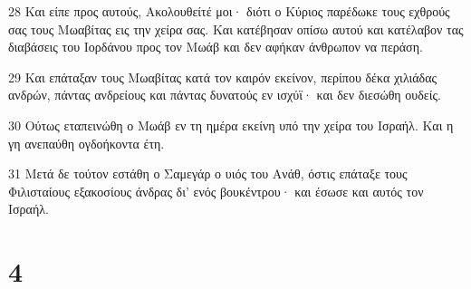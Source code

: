 \par 28 Και είπε προς αυτούς, Ακολουθείτέ μοι· διότι ο Κύριος παρέδωκε τους εχθρούς σας τους Μωαβίτας εις την χείρα σας. Και κατέβησαν οπίσω αυτού και κατέλαβον τας διαβάσεις του Ιορδάνου προς τον Μωάβ και δεν αφήκαν άνθρωπον να περάση.
\par 29 Και επάταξαν τους Μωαβίτας κατά τον καιρόν εκείνον, περίπου δέκα χιλιάδας ανδρών, πάντας ανδρείους και πάντας δυνατούς εν ισχύϊ· και δεν διεσώθη ουδείς.
\par 30 Ούτως εταπεινώθη ο Μωάβ εν τη ημέρα εκείνη υπό την χείρα του Ισραήλ. Και η γη ανεπαύθη ογδοήκοντα έτη.
\par 31 Μετά δε τούτον εστάθη ο Σαμεγάρ ο υιός του Ανάθ, όστις επάταξε τους Φιλισταίους εξακοσίους άνδρας δι' ενός βουκέντρου· και έσωσε και αυτός τον Ισραήλ.

\chapter{4}

